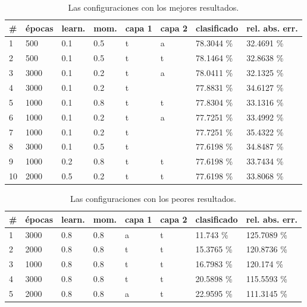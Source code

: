 \documentclass{article}
\begin{document}
\begin{table}
\begin{tabular}{|l||l|l|l|l|l||l|l|}
\hline
\# & épocas & learn. & mom. & capa 1 & capa 2 & clasificado & rel. abs. err. \\
\hline
 1& 500    & 0.1    & 0.5    & t    & a    & 78.3044 \%  & 32.4691 \% \\
 2& 500    & 0.1    & 0.5    & t    & t    & 78.1464 \%  & 32.8638 \% \\
 3& 3000   & 0.1    & 0.2    & t    & a    & 78.0411 \%  & 32.1325 \% \\
 4& 3000   & 0.1    & 0.2    & t    &      & 77.8831 \%  & 34.6127 \% \\
 5& 1000   & 0.1    & 0.8    & t    & t    & 77.8304 \%  & 33.1316 \% \\
 6& 1000   & 0.1    & 0.2    & t    & a    & 77.7251 \%  & 33.4992 \% \\
 7& 1000   & 0.1    & 0.2    & t    &      & 77.7251 \%  & 35.4322 \% \\
 8& 3000   & 0.1    & 0.5    & t    &      & 77.6198 \%  & 34.8487 \% \\
 9& 1000   & 0.2    & 0.8    & t    & t    & 77.6198 \%  & 33.7434 \% \\
10& 2000   & 0.5    & 0.2    & t    & t    & 77.6198 \%  & 33.8068 \% \\
\hline
\end{tabular}
\caption{Las configuraciones con los mejores resultados.}
\label{table:results_best}
\end{table}

\begin{table}
\begin{tabular}{|l||l|l|l|l|l||l|l|}
\hline
\# & épocas & learn. & mom. & capa 1 & capa 2 & clasificado & rel. abs. err. \\
\hline
 1& 3000   & 0.8    & 0.8    & a    & t    & 11.743  \%   & 125.7089 \% \\
 2& 2000   & 0.8    & 0.8    & t    & t    & 15.3765 \%   & 120.8736 \% \\
 3& 1000   & 0.8    & 0.8    & t    & t    & 16.7983 \%   & 120.174  \% \\
 4& 3000   & 0.8    & 0.8    & t    & t    & 20.5898 \%   & 115.5593 \% \\
 5& 2000   & 0.8    & 0.8    & a    & t    & 22.9595 \%   & 111.3145 \% \\
\hline
\end{tabular}
\caption{Las configuraciones con los peores resultados.}
\label{table:results_worst}
\end{table}
\end{document}
